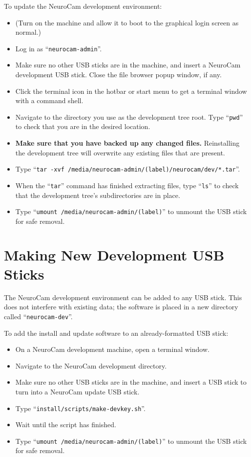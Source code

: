 To update the NeuroCam development environment:
\begin{itemize}
\item (Turn on the machine and allow it to boot to the graphical login
screen as normal.)
\item Log in as ``\verb+neurocam-admin+''.
\item Make sure no other USB sticks are in the machine, and insert a NeuroCam
development USB stick. Close the file browser popup window, if any.
\item Click the terminal icon in the hotbar or start menu to get a terminal
window with a command shell.
\item Navigate to the directory you use as the development tree root.
Type ``\verb+pwd+'' to check that you are in the desired location.
\item \textbf{Make sure that you have backed up any changed files.}
Reinstalling the development tree will overwrite any existing files that are
present.
\item Type ``\verb+tar -xvf /media/neurocam-admin/(label)/neurocam/dev/*.tar+''.
\item When the ``\verb+tar+'' command has finished extracting files, type
``\verb+ls+'' to check that the development tree's subdirectories are in 
place.
\item Type ``\verb+umount /media/neurocam-admin/(label)+'' to unmount the
USB stick for safe removal.
\end{itemize}

%
%
\section{Making New Development USB Sticks}
\label{devmachine-usb}

The NeuroCam development environment can be added to any USB stick. This
does not interfere with existing data; the software is placed in a new
directory called ``\verb+neurocam-dev+''.

To add the install and update software to an already-formatted USB stick:
\begin{itemize}
\item On a NeuroCam development machine, open a terminal window.
\item Navigate to the NeuroCam development directory.
\item Make sure no other USB sticks are in the machine, and insert a USB
stick to turn into a NeuroCam update USB stick.
\item Type ``\verb+install/scripts/make-devkey.sh+''.
\item Wait until the script has finished.
\item Type ``\verb+umount /media/neurocam-admin/(label)+'' to unmount the
USB stick for safe removal.
\end{itemize}

%
